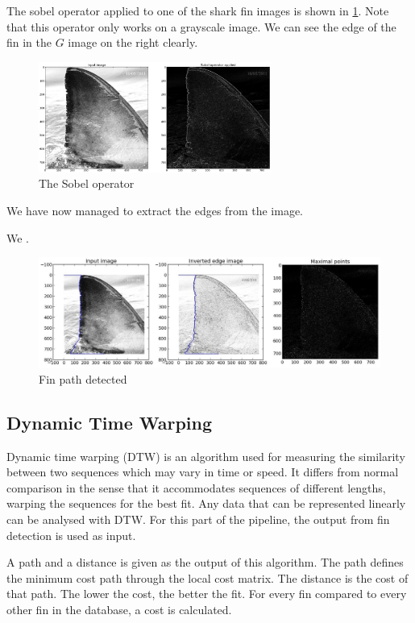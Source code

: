 \documentclass[a4paper,10pt]{article}
\begin{document}
The sobel operator applied to one of the shark fin images is shown in \ref{sobel}.  Note that this operator only works on a grayscale image.
We can see the edge of the fin in the $G$ image on the right clearly.

\begin{figure}[H]
 \centering
 \includegraphics[width=3in]{sobel.jpg}
 \caption{The Sobel operator}
 \label{sobel}
\end{figure}

We have now managed to extract the edges from the image.

We .

\begin{figure}[H]
 \centering
 \includegraphics[width=5in]{finpath.jpg}
 \caption{Fin path detected}
 \label{fin}
\end{figure}



\subsection{Dynamic Time Warping}
Dynamic time warping (DTW) is an algorithm used for measuring the similarity between two sequences which may vary in time or speed.
It differs from normal comparison in the sense that it accommodates sequences of different lengths, warping the sequences for the best fit.
Any data that can be represented linearly can be analysed with DTW.  For this part of the pipeline, the output from fin detection is used as input.

A path and a distance is given as the output of this algorithm. The path defines the minimum cost path through the local cost matrix. 
The distance is the cost of that path. 
The lower the cost, the better the fit. For every fin compared to every other fin in the database, a cost is calculated. \\
\end{document}
